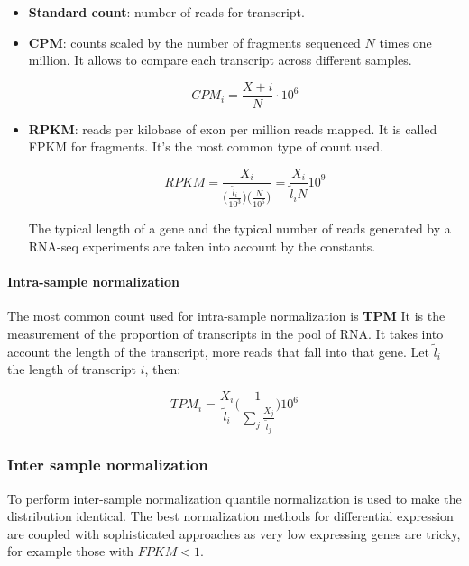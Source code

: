 			\begin{itemize}
				\item \textbf{Standard count}: number of reads for transcript.
				\item \textbf{CPM}: counts scaled by the number of fragments sequenced $N$ times one million.
					It allows to compare each transcript across different samples.

					$$CPM_i = \frac{X+i}{N}\cdot 10^6$$

				\item \textbf{RPKM}: reads per kilobase of exon per million reads mapped.
					It is called FPKM for fragments.
					It's the most common type of count used.


					$$RPKM = \frac{X_i}{\big(\frac{\tilde{l}_i}{10^3}\big)\big(\frac{N}{10^6}\big)} = \frac{X_i}{\tilde{l}_iN}10^9$$

					The typical length of a gene and the typical number of reads generated by a RNA-seq experiments are taken into account by the constants.
			\end{itemize}

			\paragraph{Intra-sample normalization}
			The most common count used for intra-sample normalization is \textbf{TPM}
			It is the measurement of the proportion of transcripts in the pool of RNA.
			It takes into account the length of the transcript, more reads that fall into that gene.
			Let $\tilde{l}_i$ the length of transcript $i$, then:

			$$TPM_i = \frac{X_i}{\tilde{l}_i}\biggl(\frac{1}{\sum\limits_j\frac{X_j}{\tilde{l}_j}}\biggr)10^6$$

		\subsubsection{Inter sample normalization}
		To perform inter-sample normalization quantile normalization is used to make the distribution identical.
		The best normalization methods for differential expression are coupled with sophisticated approaches as very low expressing genes are tricky, for example those with $FPKM<1$.
